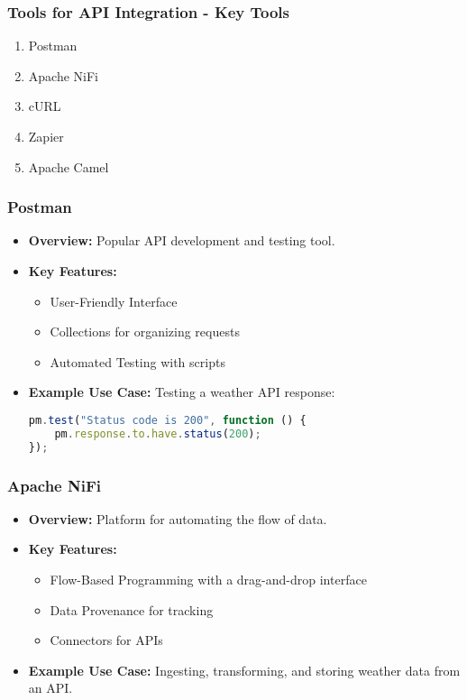 \documentclass[aspectratio=169]{beamer}
\begin{document}
\begin{frame}[fragile]
    \frametitle{Tools for API Integration - Key Tools}
    \begin{enumerate}
        \item Postman
        \item Apache NiFi
        \item cURL
        \item Zapier
        \item Apache Camel
    \end{enumerate}
\end{frame}

\begin{frame}[fragile]
    \frametitle{Postman}
    \begin{itemize}
        \item \textbf{Overview:} Popular API development and testing tool.
        \item \textbf{Key Features:}
        \begin{itemize}
            \item User-Friendly Interface
            \item Collections for organizing requests
            \item Automated Testing with scripts
        \end{itemize}
        \item \textbf{Example Use Case:} Testing a weather API response:
        \begin{lstlisting}[language=JavaScript]
pm.test("Status code is 200", function () {
    pm.response.to.have.status(200);
});
        \end{lstlisting}
    \end{itemize}
\end{frame}

\begin{frame}[fragile]
    \frametitle{Apache NiFi}
    \begin{itemize}
        \item \textbf{Overview:} Platform for automating the flow of data.
        \item \textbf{Key Features:}
        \begin{itemize}
            \item Flow-Based Programming with a drag-and-drop interface
            \item Data Provenance for tracking
            \item Connectors for APIs
        \end{itemize}
        \item \textbf{Example Use Case:} Ingesting, transforming, and storing weather data from an API.
    \end{itemize}
\end{frame}
\end{document}
